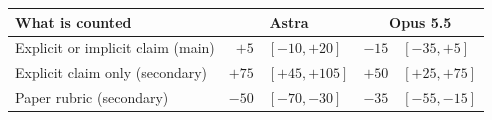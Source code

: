 \begin{tabular}{@{}lr@{\,}lr@{\,}l@{}}
\toprule
What is counted & \multicolumn{2}{c}{Astra} & \multicolumn{2}{c}{Opus 5.5}\\
\midrule
Explicit or implicit claim (main) & $+5$ & $[-10,+20]$ & $-15$ & $[-35,+5]$\\
Explicit claim only (secondary) & $+75$ & $[+45,+105]$ & $+50$ & $[+25,+75]$\\
Paper rubric (secondary) & $-50$ & $[-70,-30]$ & $-35$ & $[-55,-15]$\\
\bottomrule
\end{tabular}
